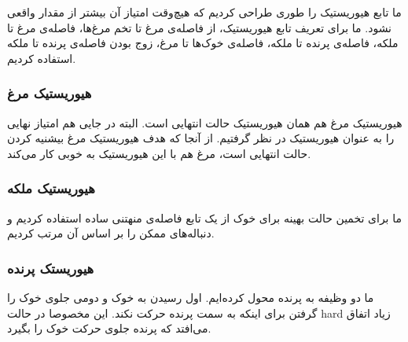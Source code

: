 \documentclass[11pt, a4paper, oneside]{article}
\begin{document}
ما تابع هیوریستیک را طوری طراحی کردیم که هیچ‌وقت امتیاز آن بیشتر از مقدار واقعی نشود. ما برای تعریف تابع هیوریستیک، از فاصله‌ی مرغ تا تخم مرغ‌ها، فاصله‌ی مرغ تا ملکه، فاصله‌ی پرنده تا ملکه، فاصله‌ی خوک‌ها تا مرغ، زوج بودن فاصله‌ی پرنده تا ملکه استفاده کردیم.
	\subsubsection{هیوریستیک مرغ}
	هیوریستیک مرغ هم همان هیوریستیک  حالت انتهایی است. البته در جایی هم امتیاز نهایی را به عنوان هیوریستیک در نظر گرفتیم. از آنجا که هدف هیوریستیک مرغ بیشنیه کردن حالت انتهایی است، مرغ هم با این هیوریستیک به خوبی کار می‌کند.
	
\subsubsection{هیوریستیک ملکه}
ما برای تخمین حالت بهینه برای خوک از یک تابع فاصله‌ی منهتنی ساده استفاده کردیم و دنباله‌های ممکن را بر اساس آن مرتب کردیم.

\subsubsection{هیوریستک پرنده}
ما دو وظیفه به پرنده محول کرده‌ایم. اول رسیدن به خوک و دومی جلوی خوک را گرفتن برای اینکه به سمت پرنده حرکت نکند. این مخصوصا در حالت hard زیاد اتفاق می‌افتد که پرنده جلوی حرکت خوک را بگیرد.
\end{document}
